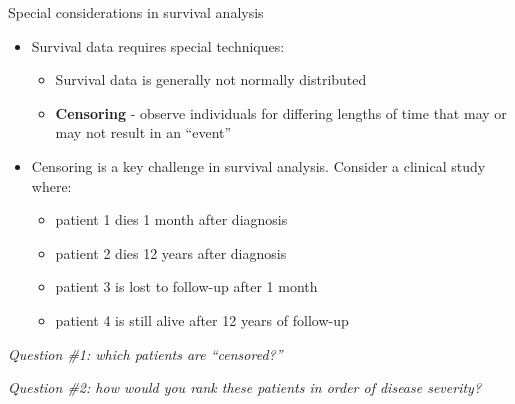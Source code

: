 \documentclass[
  ignorenonframetext,
]{beamer}
\providecommand{\tightlist}{%
  \setlength{\itemsep}{0pt}\setlength{\parskip}{0pt}}
\begin{document}
\begin{frame}{Special considerations in survival analysis}
\protect\hypertarget{special-considerations-in-survival-analysis}{}

\begin{itemize}
\tightlist
\item
  Survival data requires special techniques:

  \begin{itemize}
  \tightlist
  \item
    Survival data is generally not normally distributed
  \item
    \textbf{Censoring} - observe individuals for differing lengths of
    time that may or may not result in an ``event''
  \end{itemize}
\item
  Censoring is a key challenge in survival analysis. Consider a clinical
  study where:

  \begin{itemize}
  \tightlist
  \item
    patient 1 dies 1 month after diagnosis
  \item
    patient 2 dies 12 years after diagnosis
  \item
    patient 3 is lost to follow-up after 1 month
  \item
    patient 4 is still alive after 12 years of follow-up
  \end{itemize}
\end{itemize}

\emph{Question \#1: which patients are ``censored?''}

\emph{Question \#2: how would you rank these patients in order of
disease severity?}

\end{frame}
\end{document}
